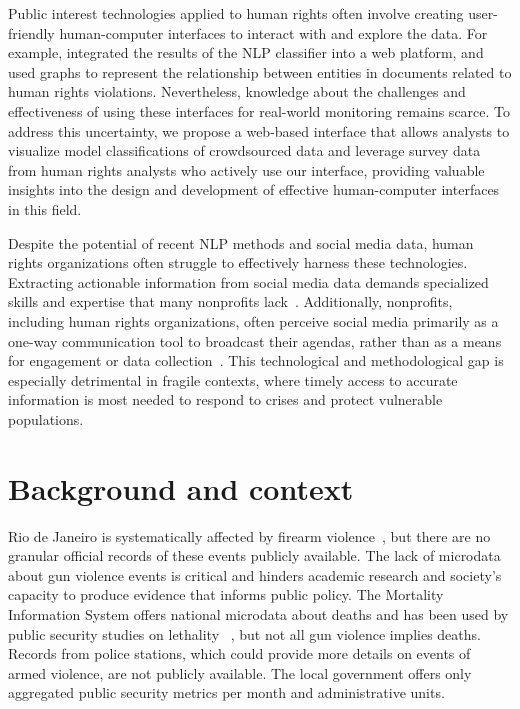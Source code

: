 \documentclass[11pt,letterpaper]{article}
\begin{document}
Public interest technologies applied to human rights often involve creating user-friendly human-computer interfaces to interact with and explore the data. For example, \citet{alhelbawyNLPPoweredHumanRights2020} integrated the results of the NLP classifier into a web platform, and \citet{millerDiggingHumanRights2013} used graphs to represent the relationship between entities in documents related to human rights violations. Nevertheless, knowledge about the challenges and effectiveness of using these interfaces for real-world monitoring remains scarce. To address this uncertainty, we propose a web-based interface that allows analysts to visualize model classifications of crowdsourced data and leverage survey data from human rights analysts who actively use our interface, providing valuable insights into the design and development of effective human-computer interfaces in this field.

Despite the potential of recent NLP methods and social media data, human rights organizations often struggle to effectively harness these technologies. Extracting actionable information from social media data demands specialized skills and expertise that many nonprofits lack~\citep{farmerDataSocialGood2023}. Additionally, nonprofits, including human rights organizations, often perceive social media primarily as a one-way communication tool to broadcast their agendas, rather than as a means for engagement or data collection~\citep{namisangoWhatWeKnow2019}. This technological and methodological gap is especially detrimental in fragile contexts, where timely access to accurate information is most needed to respond to crises and protect vulnerable populations.

\section{Background and context}
\label{chap:background}
Rio de Janeiro is systematically affected by firearm violence~\citep{silvaNoMeioFogo2021,lemgruberTirosNoFuturo2022}, but there are no granular official records of these events publicly available. The lack of microdata about gun violence events is critical and hinders academic research and society's capacity to produce evidence that informs public policy. The Mortality Information System offers national microdata about deaths and has been used by public security studies on lethality ~\citep{silvaNoMeioFogo2021,buenos_anuario_2023}, but not all gun violence implies deaths. Records from police stations, which could provide more details on events of armed violence, are not publicly available. The local government offers only aggregated public security metrics per month and administrative units. 
\end{document}
